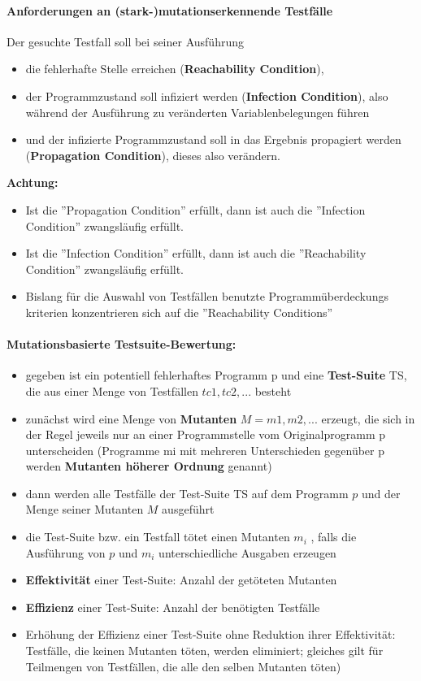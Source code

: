 \paragraph{Anforderungen an (stark-)mutationserkennende Testfälle}

Der gesuchte Testfall soll bei seiner Ausführung
\begin{itemize}
	\item die fehlerhafte Stelle erreichen (\textbf{Reachability Condition}),
	\item der Programmzustand soll infiziert werden (\textbf{Infection Condition}), also während der Ausführung zu veränderten Variablenbelegungen führen
	\item und der infizierte Programmzustand soll in das Ergebnis propagiert werden (\textbf{Propagation Condition}), dieses also verändern.
\end{itemize}
\textbf{Achtung:}
\begin{itemize}
	\item Ist die ''Propagation Condition'' erfüllt, dann ist auch die ''Infection Condition'' zwangsläufig erfüllt.
	\item Ist die ''Infection Condition'' erfüllt, dann ist auch die ''Reachability Condition'' zwangsläufig erfüllt.
	\item Bislang für die Auswahl von Testfällen benutzte Programmüberdeckungs kriterien konzentrieren sich auf die ''Reachability Conditions''
\end{itemize}

\paragraph{Mutationsbasierte Testsuite-Bewertung:}
\begin{itemize}
	\item gegeben ist ein potentiell fehlerhaftes Programm p und eine \textbf{Test-Suite} TS, die aus einer Menge von Testfällen ${tc1, tc2, ... }$ besteht
	\item zunächst wird eine Menge von \textbf{Mutanten} $M = {m1, m2, ... }$ erzeugt, die sich in der Regel jeweils nur an einer Programmstelle vom Originalprogramm p unterscheiden (Programme mi mit mehreren Unterschieden gegenüber p werden \textbf{Mutanten höherer Ordnung} genannt)
	\item dann werden alle Testfälle der Test-Suite TS auf dem Programm $p$ und der Menge seiner Mutanten $M$ ausgeführt
	\item die Test-Suite bzw. ein Testfall tötet einen Mutanten $m_i$ , falls die Ausführung von $p$ und $m_i$ unterschiedliche Ausgaben erzeugen
	\item \textbf{Effektivität} einer Test-Suite: Anzahl der getöteten Mutanten
	\item \textbf{Effizienz} einer Test-Suite: Anzahl der benötigten Testfälle
	\item Erhöhung der Effizienz einer Test-Suite ohne Reduktion ihrer Effektivität: Testfälle, die keinen Mutanten töten, werden eliminiert; gleiches gilt für Teilmengen von Testfällen, die alle den selben Mutanten töten)
\end{itemize}

